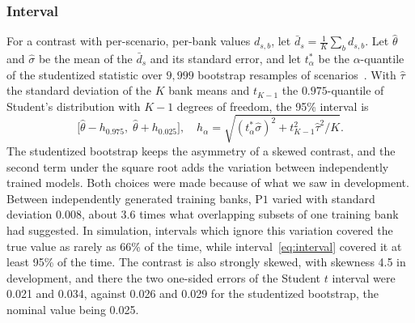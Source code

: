 \documentclass[conference]{IEEEtran}
\newcommand{\Pone}{\mathrm{P1}}
\begin{document}
\subsubsection*{Interval}
For a contrast with per-scenario, per-bank values $d_{s,b}$, let $\bar d_s=\frac1K\sum_b d_{s,b}$. Let $\hat\theta$ and $\hat\sigma$ be the mean of the $\bar d_s$ and its standard error, and let $t^*_\alpha$ be the $\alpha$-quantile of the studentized statistic over $9{,}999$ bootstrap resamples of scenarios~\cite{efron1993}. With $\hat\tau$ the standard deviation of the $K$ bank means and $t_{K-1}$ the $0.975$-quantile of Student's distribution with $K-1$ degrees of freedom, the 95\% interval is
\begin{equation}\label{eq:interval}
  \bigl[\hat\theta-h_{0.975},\;\hat\theta+h_{0.025}\bigr],\quad
  h_\alpha=\sqrt{(t^*_\alpha\hat\sigma)^2+t_{K-1}^2\hat\tau^2/K}.
\end{equation}
The studentized bootstrap keeps the asymmetry of a skewed contrast, and the second term under the square root adds the variation between independently trained models.
Both choices were made because of what we saw in development. Between independently generated training banks, $\Pone$ varied with standard deviation 0.008, about 3.6 times what overlapping subsets of one training bank had suggested.
In simulation, intervals which ignore this variation covered the true value as rarely as 66\% of the time, while interval~\eqref{eq:interval} covered it at least 95\% of the time.
The contrast is also strongly skewed, with skewness 4.5 in development, and there the two one-sided errors of the Student $t$ interval were 0.021 and 0.034, against 0.026 and 0.029 for the studentized bootstrap, the nominal value being 0.025.
\end{document}

